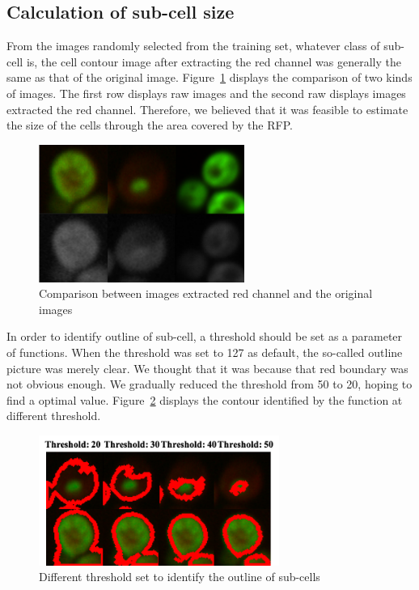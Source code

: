 \documentclass[12pt]{article}
\begin{document}
\subsection*{Calculation of sub-cell size}
\par From the images randomly selected from the training set, whatever class of sub-cell is, 
the cell contour image after extracting the red channel was generally the same as that of the original image. Figure~\ref{fig:comp} displays the comparison of two kinds of images. The first row displays raw images and the second raw displays images extracted the red channel. Therefore, we believed that it was feasible to estimate the size of the cells through the area covered by the RFP.
\begin{figure}[!htbp]
    \centering
    \includegraphics[width=0.6\textwidth]{3.png}
    \caption{Comparison between images extracted red channel and the original images}
    \label{fig:comp}
\end{figure}
\par In order to identify outline of sub-cell, a threshold should be set as a parameter of functions. When the threshold was set to 127 as default, the so-called outline picture was merely clear. We thought that it was because that red boundary was not obvious enough. We gradually reduced the threshold from 50 to 20, hoping to find a optimal value. Figure~\ref{fig:outline} displays the contour identified by the function at different threshold.
\begin{figure}[!htbp]
    \centering
    \includegraphics[width=0.7\textwidth]{4.png}
    \caption{Different threshold set to identify the outline of sub-cells}
    \label{fig:outline}
\end{figure}
\end{document}
